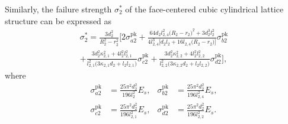 \documentclass[12pt,a4paper]{article}
\begin{document}
	Similarly, the failure strength $\sigma_2^*$ of the face-centered cubic cylindrical lattice structure can be expressed as
	\begin{multline}
			\sigma_2^*
			=
			\frac{3d_2^2}{R_2^2-r_2^2}
			\Bigg[
			2\sigma_{a2}^{\mathrm{pk}}
			+
			\frac{
				64d_2l_{2,4}^2\bigl(R_2-r_2\bigr)^2
				+3d_2^3l_2^2
			}{
				4l_{2,4}^3
				\bigl[d_2l_2+16l_{2,4}\bigl(R_2-r_2\bigr)\bigr]
			}
			\sigma_{b2}^{\mathrm{pk}} \\
			+
			\frac{
				3d_2^2\kappa_{2,1}^2
				+4l_2^2l_{2,1}^2
			}{
				l_{2,1}^2
				\bigl(3\kappa_{2,1}d_2+l_2l_{2,1}\bigr)
			}
			\sigma_{c2}^{\mathrm{pk}} 
			+
			\frac{
				3d_2^2\kappa_{2,2}^2
				+4l_2^2l_{2,2}^2
			}{
				l_{2,2}^2
				\bigl(3\kappa_{2,2}d_2+l_2l_{2,2}\bigr)
			}
			\sigma_{d2}^{\mathrm{pk}}
			\Bigg],
		\label{Eq27}
	\end{multline}
	where
	\[
	\begin{aligned}
		\sigma_{a2}^{\mathrm{pk}}
		&=
		\frac{25\pi^2d_2^2}{196l_2^2}E_s, &
		\sigma_{b2}^{\mathrm{pk}}
		&=
		\frac{25\pi^2d_2^2}{196l_{2,4}^2}E_s, \\
		\sigma_{c2}^{\mathrm{pk}}
		&=
		\frac{25\pi^2d_2^2}{196l_{2,1}^2}E_s, &
		\sigma_{d2}^{\mathrm{pk}}
		&=
		\frac{25\pi^2d_2^2}{196l_{2,2}^2}E_s .
	\end{aligned}
	\]
	
\end{document}
